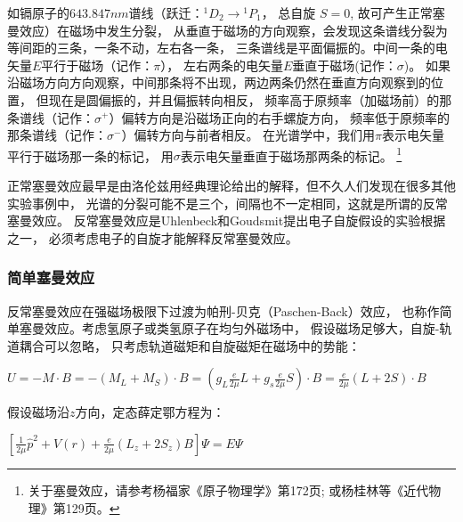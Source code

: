 如镉原子的$643.847nm$谱线（跃迁：${}^1D_2  \to {}^1P_1 $， 总自旋
$S=0$, 故可产生正常塞曼效应）在磁场中发生分裂，
从垂直于磁场的方向观察，会发现这条谱线分裂为等间距的三条，一条不动，左右各一条，
三条谱线是平面偏振的。中间一条的电矢量$E$平行于磁场（记作：$\pi$），
左右两条的电矢量$E$垂直于磁场(记作：$\sigma$)。
如果沿磁场方向方向观察，中间那条将不出现，两边两条仍然在垂直方向观察到的位置，
但现在是圆偏振的，并且偏振转向相反，
频率高于原频率（加磁场前）的那条谱线（记作：$\sigma ^ +
$）偏转方向是沿磁场正向的右手螺旋方向，
频率低于原频率的那条谱线（记作：$\sigma ^ -  $）偏转方向与前者相反。
在光谱学中，我们用$\pi$表示电矢量平行于磁场那一条的标记，
用$\sigma$表示电矢量垂直于磁场那两条的标记。
\footnote{关于塞曼效应，请参考杨福家《原子物理学》第172页;
或杨桂林等《近代物理》第129页。}

正常塞曼效应最早是由洛伦兹用经典理论给出的解释，但不久人们发现在很多其他实验事例中，
光谱的分裂可能不是三个，间隔也不一定相同，这就是所谓的反常塞曼效应。
反常塞曼效应是Uhlenbeck和Goudsmit提出电子自旋假设的实验根据之一，
必须考虑电子的自旋才能解释反常塞曼效应。


\subsubsection{简单塞曼效应}




反常塞曼效应在强磁场极限下过渡为帕刑-贝克（Paschen-Back）效应，
也称作简单塞曼效应。考虑氢原子或类氢原子在均匀外磁场中，
假设磁场足够大，自旋-轨道耦合可以忽略，
只考虑轨道磁矩和自旋磁矩在磁场中的势能：

$U = - M \cdot B =  - \left( {M_L  + M_S } \right) \cdot B = \left(
{g_L \frac{e}{{2\mu }}L + g_s \frac{e}{{2\mu }}S} \right) \cdot B =
\frac{e}{{2\mu }}\left( {L + 2S} \right) \cdot B$

假设磁场沿$z$方向，定态薛定鄂方程为：

$\left[ {\frac{1}{{2\mu }}\widehat p^2 + V(r) + \frac{e}{{2\mu
}}\left( {L_z  + 2S_z } \right)B} \right]\Psi  = E\Psi $

